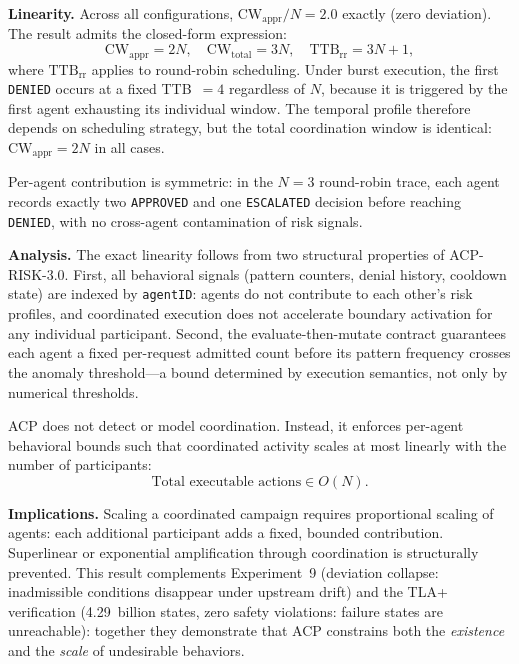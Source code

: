 \documentclass[11pt]{article}
\theoremstyle{definition}
\begin{document}
\textbf{Linearity.}
Across all configurations, $\mathrm{CW}_\mathrm{appr}/N = 2.0$ exactly
(zero deviation).
The result admits the closed-form expression:
\[
  \mathrm{CW}_\mathrm{appr} = 2N, \quad
  \mathrm{CW}_\mathrm{total} = 3N, \quad
  \mathrm{TTB}_\mathrm{rr} = 3N + 1,
\]
where $\mathrm{TTB}_\mathrm{rr}$ applies to round-robin scheduling.
Under burst execution, the first \texttt{DENIED} occurs at a fixed
TTB~$= 4$ regardless of $N$, because it is triggered by the first agent
exhausting its individual window.
The temporal profile therefore depends on scheduling strategy, but the total
coordination window is identical: $\mathrm{CW}_\mathrm{appr} = 2N$ in all
cases.

Per-agent contribution is symmetric: in the $N=3$ round-robin trace,
each agent records exactly two \texttt{APPROVED} and one
\texttt{ESCALATED} decision before reaching \texttt{DENIED},
with no cross-agent contamination of risk signals.

\textbf{Analysis.}
The exact linearity follows from two structural properties of ACP-RISK-3.0.
First, all behavioral signals (pattern counters, denial history, cooldown
state) are indexed by \texttt{agentID}: agents do not contribute to each
other's risk profiles, and coordinated execution does not accelerate boundary
activation for any individual participant.
Second, the evaluate-then-mutate contract guarantees each agent a fixed
per-request admitted count before its pattern frequency crosses the anomaly
threshold---a bound determined by execution semantics, not only by numerical
thresholds.

ACP does not detect or model coordination.
Instead, it enforces per-agent behavioral bounds such that coordinated activity
scales at most linearly with the number of participants:
\[
  \text{Total executable actions} \in O(N).
\]

\textbf{Implications.}
Scaling a coordinated campaign requires proportional scaling of agents:
each additional participant adds a fixed, bounded contribution.
Superlinear or exponential amplification through coordination is structurally
prevented.
This result complements Experiment~9 (deviation collapse: inadmissible
conditions disappear under upstream drift) and the TLA+ verification
(4.29~billion states, zero safety violations: failure states are unreachable):
together they demonstrate that ACP constrains both the \emph{existence} and
the \emph{scale} of undesirable behaviors.

\end{document}
